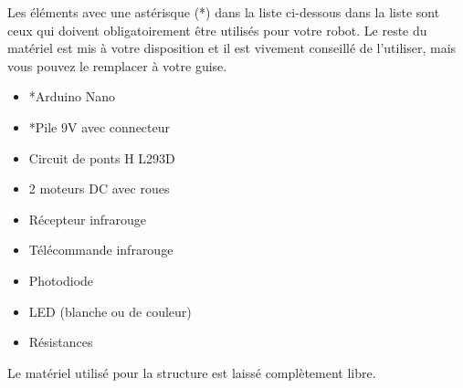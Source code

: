 Les éléments avec une astérisque (*) dans la liste ci-dessous dans la liste sont ceux qui doivent obligatoirement être utilisés pour votre robot. Le reste du matériel est mis à votre disposition et il est vivement conseillé de l'utiliser, mais vous pouvez le remplacer à votre guise.
\begin{itemize}
\item *Arduino Nano
\item *Pile 9V avec connecteur
\item Circuit de ponts H L293D
\item 2 moteurs DC avec roues
\item Récepteur infrarouge
\item Télécommande infrarouge
\item Photodiode
\item LED (blanche ou de couleur)
\item Résistances
\end{itemize}
Le matériel utilisé pour la structure est laissé complètement libre.